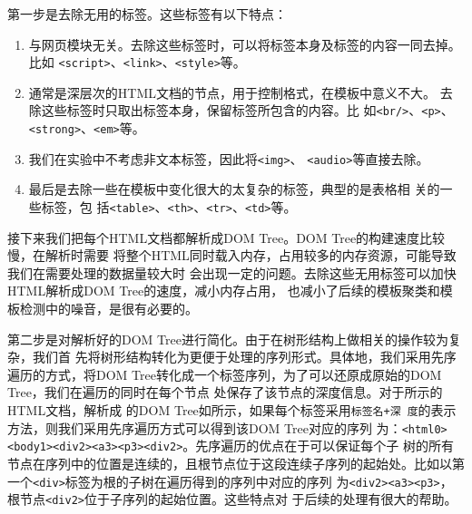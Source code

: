 第一步是去除无用的标签。这些标签有以下特点：
\begin{enumerate}
 \item\label{item:1} 与网页模块无关。去除这些标签时，可以将标签本身及标签的内容一同去掉。比如
  \texttt{<script>}、\texttt{<link>}、\texttt{<style>}等。
\item\label{item:2} 通常是深层次的HTML文档的节点，用于控制格式，在模板中意义不大。
  去除这些标签时只取出标签本身，保留标签所包含的内容。比
  如\texttt{<br/>}、\texttt{<p>}、\texttt{<strong>}、\texttt{<em>}等。
\item\label{item:3} 我们在实验中不考虑非文本标签，因此将\texttt{<img>}、
  \texttt{<audio>}等直接去除。
\item\label{item:4} 最后是去除一些在模板中变化很大的太复杂的标签，典型的是表格相
  关的一些标签，包
  括\texttt{<table>}、\texttt{<th>}、\texttt{<tr>}、\texttt{<td>}等。
\end{enumerate}

接下来我们把每个HTML文档都解析成DOM Tree。DOM Tree的构建速度比较慢，在解析时需要
将整个HTML同时载入内存，占用较多的内存资源，可能导致我们在需要处理的数据量较大时
会出现一定的问题。去除这些无用标签可以加快HTML解析成DOM Tree的速度，减小内存占用，
也减小了后续的模板聚类和模板检测中的噪音，是很有必要的。

第二步是对解析好的DOM Tree进行简化。由于在树形结构上做相关的操作较为复杂，我们首
先将树形结构转化为更便于处理的序列形式。具体地，我们采用先序遍历的方式，将DOM
Tree转化成一个标签序列，为了可以还原成原始的DOM Tree，我们在遍历的同时在每个节点
处保存了该节点的深度信息。对于所示的HTML文档，解析成
的DOM Tree如所示，如果每个标签采用\texttt{标签名+深
  度}的表示方法，则我们采用先序遍历方式可以得到该DOM Tree对应的序列
为：\texttt{<html0><body1><div2><a3><p3><div2>}。先序遍历的优点在于可以保证每个子
树的所有节点在序列中的位置是连续的，且根节点位于这段连续子序列的起始处。比如以第
一个\texttt{<div>}标签为根的子树在遍历得到的序列中对应的序列
为\texttt{<div2><a3><p3>}，根节点\texttt{<div2>}位于子序列的起始位置。这些特点对
于后续的处理有很大的帮助。

